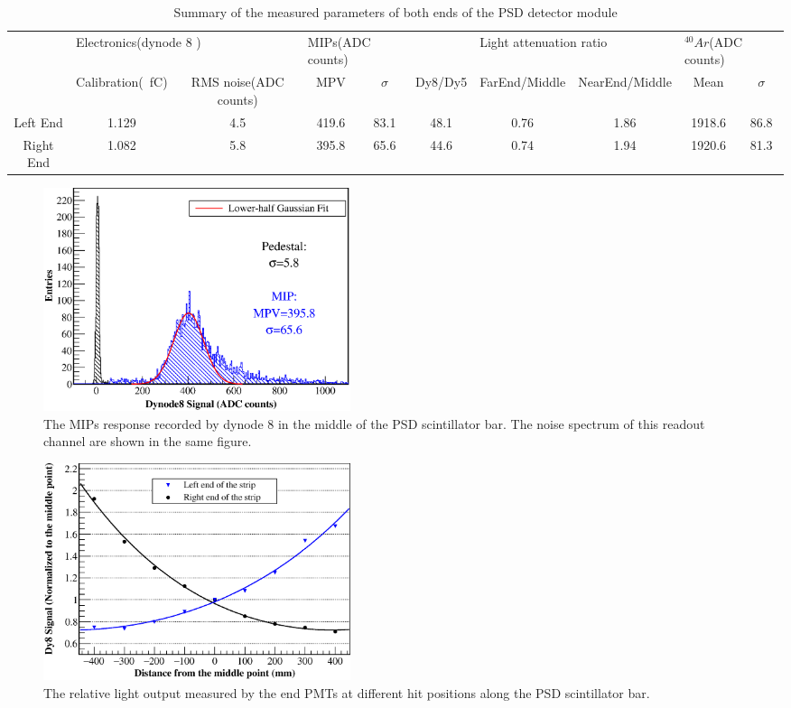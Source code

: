 \documentclass[5p, times]{elsarticle}
\begin{document}
\begin{table}\footnotesize
	\centering
	\caption{Summary of the measured parameters of both ends of the PSD detector module}
	\label{tab:summary} 
\begin{tabular}{cccccccccc}
	\toprule
	&\multicolumn{2}{l}{Electronics(dynode 8 )}&\multicolumn{2}{l}{MIPs(ADC counts)}&\multicolumn{1}{l}{}&\multicolumn{2}{l}{Light attenuation ratio}&\multicolumn{2}{l}{$^{40}Ar$(ADC counts)} \\
	\cmidrule(r){2-3}\cmidrule(r){4-5}\cmidrule(r){7-8}\cmidrule(r){9-10}
	& Calibration(\si{\per\femto\coulomb}) & RMS noise(ADC counts) & MPV & $\sigma$ & Dy8/Dy5 & FarEnd/Middle & NearEnd/Middle & Mean & $\sigma$ \\
	\midrule 
	Left End & 1.129 & 4.5 & 419.6 & 83.1 & 48.1 & 0.76 & 1.86 & 1918.6 & 86.8 \\ 
	Right End & 1.082 & 5.8 & 395.8 & 65.6 & 44.6 & 0.74 & 1.94 & 1920.6 & 81.3 \\ 
	\bottomrule
\end{tabular}
\end{table}

\begin{figure}
	\centering
	\includegraphics[width=90mm]{mip}
	\caption{The MIPs response recorded by dynode 8 in the middle of the PSD scintillator bar. The noise spectrum of this readout channel are shown in the same figure.}
	\label{fig:mip}
\end{figure} 

\begin{figure}
	\centering
	\includegraphics[width=90mm]{attenuation}
	\caption{The relative light output measured by the end PMTs at different hit positions along the PSD scintillator bar.}
	\label{fig:attenuation}
\end{figure} 
\end{document}
